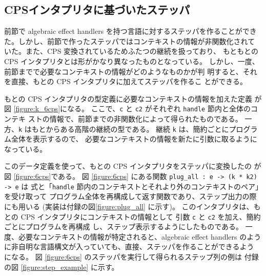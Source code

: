 \subsection{CPSインタプリタに基づいたステッパ}

前節で algebraic effect handlers を持つ言語に対するステッパを作ることができ
た。しかし、前節で作ったステッパではコンテキストの情報が非関数化されて
いた。また、CPS 変換されているためふたつの継続を扱っており、
もともとの CPS インタプリタとは形がかなり異なったものとなっている。
しかし、一度、前節までで必要なコンテキストの情報がどのようなものかが判
明すると、それを直接、もとの CPS インタプリタに加えてステッパを作るこ
とができる。

もとの CPS インタプリタの型定義に必要なコンテキストの情報を加えた定義
が図 \ref{figure:k_6cps}になる。
ここで、\texttt{c} と \texttt{c2} がそれぞれ \texttt{handle} 節内と全体のコンテキ
ストの情報で、前節までの非関数化によって得られたものである。
一方、\texttt{k} はもとからある高階の継続の型である。
継続 \texttt{k} は、簡約ごとにプログラム全体を表示するので、
必要なコンテキストの情報を新たに引数に取るようになっている。

このデータ定義を使って、もとの CPS インタプリタをステッパに変換したの
が図 \ref{figure:6cps}である。
図 \ref{figure:6cps} にある関数 \texttt{plug\_all :\ e -> (k * k2) -> e} は
式と「\texttt{handle} 節内のコンテキストとそれより外のコンテキストのペア」を受け取って
プログラム全体を再構成して返す関数であり、ステップ出力の際にも用いる
(実装は付録の図\ref{figure:plug_all} に示す)。
このインタプリタは、もとの CPS インタプリタにコンテキストの情報として
引数 \texttt{c} と \texttt{c2} を加え、簡約ごとにプログラムを再構成
し、ステップ表示するようにしたものである。
一度、必要なコンテキストの情報が特定されると、algebraic effect handlers のよう
に非自明な言語構文が入っていても、直接、ステッパを作ることができるよう
になる。
図 \ref{figure:6cps} のステッパを実行して得られるステップ列の例は
付録の図 \ref{figure:step_example} に示す。
